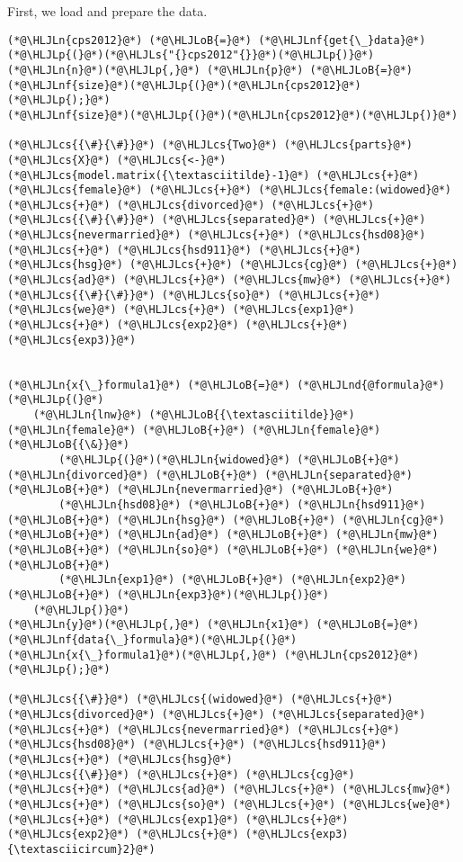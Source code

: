 \documentclass[12pt,a4paper]{article}
\newcommand{\HLJLn}[1]{#1}
\newcommand{\HLJLnd}[1]{\textcolor[RGB]{214,102,97}{#1}}
\newcommand{\HLJLnf}[1]{\textcolor[RGB]{66,102,213}{#1}}
\newcommand{\HLJLs}[1]{\textcolor[RGB]{201,61,57}{#1}}
\newcommand{\HLJLoB}[1]{\textcolor[RGB]{102,102,102}{\textbf{#1}}}
\newcommand{\HLJLp}[1]{#1}
\newcommand{\HLJLcs}[1]{\textcolor[RGB]{153,153,119}{\textit{#1}}}
\begin{document}
First, we load and prepare the data.


\begin{lstlisting}
(*@\HLJLn{cps2012}@*) (*@\HLJLoB{=}@*) (*@\HLJLnf{get{\_}data}@*)(*@\HLJLp{(}@*)(*@\HLJLs{"{}cps2012"{}}@*)(*@\HLJLp{)}@*)
(*@\HLJLn{n}@*)(*@\HLJLp{,}@*) (*@\HLJLn{p}@*) (*@\HLJLoB{=}@*) (*@\HLJLnf{size}@*)(*@\HLJLp{(}@*)(*@\HLJLn{cps2012}@*)(*@\HLJLp{);}@*)
(*@\HLJLnf{size}@*)(*@\HLJLp{(}@*)(*@\HLJLn{cps2012}@*)(*@\HLJLp{)}@*)

(*@\HLJLcs{{\#}{\#}}@*) (*@\HLJLcs{Two}@*) (*@\HLJLcs{parts}@*) (*@\HLJLcs{X}@*) (*@\HLJLcs{<-}@*) (*@\HLJLcs{model.matrix({\textasciitilde}-1}@*) (*@\HLJLcs{+}@*) (*@\HLJLcs{female}@*) (*@\HLJLcs{+}@*) (*@\HLJLcs{female:(widowed}@*) (*@\HLJLcs{+}@*) (*@\HLJLcs{divorced}@*) (*@\HLJLcs{+}@*) 
(*@\HLJLcs{{\#}{\#}}@*) (*@\HLJLcs{separated}@*) (*@\HLJLcs{+}@*) (*@\HLJLcs{nevermarried}@*) (*@\HLJLcs{+}@*) (*@\HLJLcs{hsd08}@*) (*@\HLJLcs{+}@*) (*@\HLJLcs{hsd911}@*) (*@\HLJLcs{+}@*) (*@\HLJLcs{hsg}@*) (*@\HLJLcs{+}@*) (*@\HLJLcs{cg}@*) (*@\HLJLcs{+}@*) (*@\HLJLcs{ad}@*) (*@\HLJLcs{+}@*) (*@\HLJLcs{mw}@*) (*@\HLJLcs{+}@*) 
(*@\HLJLcs{{\#}{\#}}@*) (*@\HLJLcs{so}@*) (*@\HLJLcs{+}@*) (*@\HLJLcs{we}@*) (*@\HLJLcs{+}@*) (*@\HLJLcs{exp1}@*) (*@\HLJLcs{+}@*) (*@\HLJLcs{exp2}@*) (*@\HLJLcs{+}@*) (*@\HLJLcs{exp3)}@*) 


(*@\HLJLn{x{\_}formula1}@*) (*@\HLJLoB{=}@*) (*@\HLJLnd{@formula}@*)(*@\HLJLp{(}@*)
    (*@\HLJLn{lnw}@*) (*@\HLJLoB{{\textasciitilde}}@*) (*@\HLJLn{female}@*) (*@\HLJLoB{+}@*) (*@\HLJLn{female}@*) (*@\HLJLoB{{\&}}@*) 
        (*@\HLJLp{(}@*)(*@\HLJLn{widowed}@*) (*@\HLJLoB{+}@*) (*@\HLJLn{divorced}@*) (*@\HLJLoB{+}@*) (*@\HLJLn{separated}@*) (*@\HLJLoB{+}@*) (*@\HLJLn{nevermarried}@*) (*@\HLJLoB{+}@*)
        (*@\HLJLn{hsd08}@*) (*@\HLJLoB{+}@*) (*@\HLJLn{hsd911}@*) (*@\HLJLoB{+}@*) (*@\HLJLn{hsg}@*) (*@\HLJLoB{+}@*) (*@\HLJLn{cg}@*) (*@\HLJLoB{+}@*) (*@\HLJLn{ad}@*) (*@\HLJLoB{+}@*) (*@\HLJLn{mw}@*) (*@\HLJLoB{+}@*) (*@\HLJLn{so}@*) (*@\HLJLoB{+}@*) (*@\HLJLn{we}@*) (*@\HLJLoB{+}@*) 
        (*@\HLJLn{exp1}@*) (*@\HLJLoB{+}@*) (*@\HLJLn{exp2}@*) (*@\HLJLoB{+}@*) (*@\HLJLn{exp3}@*)(*@\HLJLp{)}@*)
    (*@\HLJLp{)}@*)
(*@\HLJLn{y}@*)(*@\HLJLp{,}@*) (*@\HLJLn{x1}@*) (*@\HLJLoB{=}@*) (*@\HLJLnf{data{\_}formula}@*)(*@\HLJLp{(}@*)(*@\HLJLn{x{\_}formula1}@*)(*@\HLJLp{,}@*) (*@\HLJLn{cps2012}@*)(*@\HLJLp{);}@*)

(*@\HLJLcs{{\#}}@*) (*@\HLJLcs{(widowed}@*) (*@\HLJLcs{+}@*) (*@\HLJLcs{divorced}@*) (*@\HLJLcs{+}@*) (*@\HLJLcs{separated}@*) (*@\HLJLcs{+}@*) (*@\HLJLcs{nevermarried}@*) (*@\HLJLcs{+}@*) (*@\HLJLcs{hsd08}@*) (*@\HLJLcs{+}@*) (*@\HLJLcs{hsd911}@*) (*@\HLJLcs{+}@*) (*@\HLJLcs{hsg}@*) 
(*@\HLJLcs{{\#}}@*) (*@\HLJLcs{+}@*) (*@\HLJLcs{cg}@*) (*@\HLJLcs{+}@*) (*@\HLJLcs{ad}@*) (*@\HLJLcs{+}@*) (*@\HLJLcs{mw}@*) (*@\HLJLcs{+}@*) (*@\HLJLcs{so}@*) (*@\HLJLcs{+}@*) (*@\HLJLcs{we}@*) (*@\HLJLcs{+}@*) (*@\HLJLcs{exp1}@*) (*@\HLJLcs{+}@*) (*@\HLJLcs{exp2}@*) (*@\HLJLcs{+}@*) (*@\HLJLcs{exp3){\textasciicircum}2}@*)


\end{lstlisting}
\end{document}
